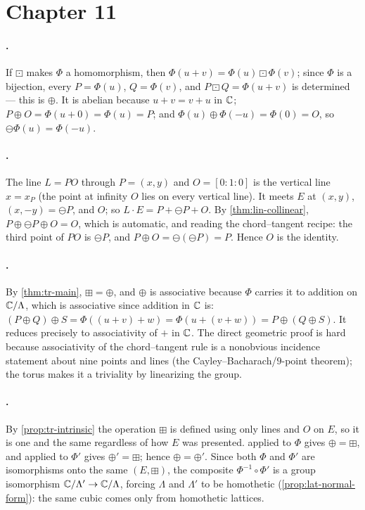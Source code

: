 \section{Chapter 11}
\label{sec:soln-ch11}

\paragraph{.}
If \(\boxdot\) makes \(\Phi\) a homomorphism, then \(\Phi(u+v) = \Phi(u) \boxdot
\Phi(v)\); since \(\Phi\) is a bijection, every \(P = \Phi(u)\), \(Q = \Phi(v)\),
and \(P \boxdot Q = \Phi(u+v)\) is determined --- this is \(\oplus\). It is abelian
because \(u + v = v + u\) in \(\mathbb{C}\); \(P \oplus O = \Phi(u + 0) = \Phi(u) = P\);
and \(\Phi(u) \oplus \Phi(-u) = \Phi(0) = O\), so \(\ominus\Phi(u) = \Phi(-u)\).

\paragraph{.}
The line \(L = PO\) through \(P = (x,y)\) and \(O = [0:1:0]\) is the vertical line
\(x = x_P\) (the point at infinity \(O\) lies on every vertical line). It meets
\(E\) at \((x, y)\), \((x, -y) = \ominus P\), and \(O\); so \(L \cdot E = P +
\ominus P + O\). By \cref{thm:lin-collinear}, \(P \oplus \ominus P \oplus O = O\),
which is automatic, and reading the chord--tangent recipe: the third point of
\(PO\) is \(\ominus P\), and \(P \oplus O = \ominus(\ominus P) = P\). Hence \(O\) is
the identity.

\paragraph{.}
By \cref{thm:tr-main}, \(\boxplus = \oplus\), and \(\oplus\) is associative because
\(\Phi\) carries it to addition on \(\mathbb{C}/\Lambda\), which is associative since
addition in \(\mathbb{C}\) is: \((P \oplus Q) \oplus S = \Phi((u+v)+w) = \Phi(u+(v+w)) =
P \oplus (Q \oplus S)\). It reduces precisely to associativity of \(+\) in \(\mathbb{C}\).
The direct geometric proof is hard because associativity of the chord--tangent rule
is a nonobvious incidence statement about nine points and lines (the
Cayley--Bacharach/\(9\)-point theorem); the torus makes it a triviality by
linearizing the group.

\paragraph{.}
By \cref{prop:tr-intrinsic} the operation \(\boxplus\) is defined using only lines
and \(O\) on \(E\), so it is one and the same regardless of how \(E\) was
presented.  applied to \(\Phi\) gives \(\oplus = \boxplus\), and
applied to \(\Phi'\) gives \(\oplus' = \boxplus\); hence \(\oplus = \oplus'\). Since
both \(\Phi\) and \(\Phi'\) are isomorphisms onto the same \((E, \boxplus)\), the
composite \(\Phi^{-1}\!\circ \Phi'\) is a group isomorphism
\(\mathbb{C}/\Lambda' \to \mathbb{C}/\Lambda\), forcing \(\Lambda\) and \(\Lambda'\) to be
homothetic (\cref{prop:lat-normal-form}): the same cubic comes only from
homothetic lattices.

